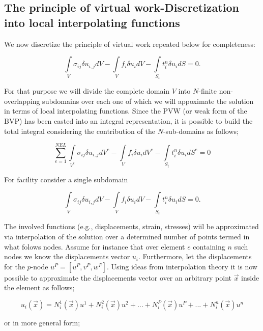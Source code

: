 \subsection{The principle of virtual work-Discretization into local interpolating functions}
We now discretize the principle of virtual work repeated below for completeness:

\begin{equation} \label{pvw_2}
\int\limits_V {{\sigma _{ij}}\delta {u_{i,j}}dV - \int\limits_V {{f_i}\delta {u_i}dV - \int\limits_{{S_t}} {t_i^n} } } \delta {u_i}dS = 0.
\end{equation}

For that purpose we will divide the complete domain $V$ into $N$-finite non-overlapping subdomains over each one of which we will appoximate the solution in terms of local interpolating functions. Since the PVW (or weak form of the BVP) has been casted into an integral representation, it is possible to build the total integral considering the contribution of the $N$-sub-domains as follows;

\begin{equation}\label{pvw_dis}
\sum\limits_{e = 1}^{NEL} {\int\limits_{{V^e}} {{\sigma _{ij}}\delta {u_{i,j}}d{V^e} - \int\limits_V {{f_i}\delta {u_i}d{V^e} - \int\limits_{{S_t}} {t_i^n} } } \delta {u_i}d{S^e} = 0} 
\end{equation}

For facility consider a single subdomain

\begin{equation} \label{pvw_sing}
\int\limits_V {{\sigma _{ij}}\delta {u_{i,j}}dV - \int\limits_V {{f_i}\delta {u_i}dV - \int\limits_{{S_t}} {t_i^n} } } \delta {u_i}dS = 0.
\end{equation}

The involved functions (e.g., displacements, strain, stresses) wiil be approximated via interpolation of the solution over a determined number of points termed in what folows nodes. Assume for instance that over element $e$ containing $n$ such nodes we know the displacements vector $u_i$. Furthermore, let the displacements for the $p$-node $u^P=[u^P, v^P, w^P]$. Using ideas from interpolation theory it is now possible to approximate the displacements vector over an arbitrary point $\vec{x}$ inside the element as follows;

\[{u_i}(\vec x) = N_i^1(\vec x){u^1} + N_i^2(\vec x){u^2} + ... + N_i^P(\vec x){u^P} + ... + N_i^n(\vec x){u^n}\]

or in more general form;

